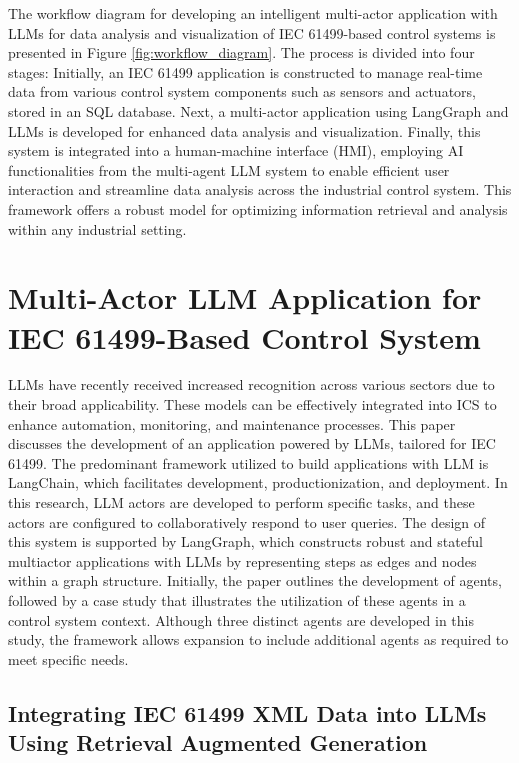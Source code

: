 \begin{bibunit}
The workflow diagram for developing an intelligent multi-actor application with LLMs for data analysis and visualization of IEC 61499-based control systems is presented in Figure \ref{fig:workflow_diagram}. The process is divided into four stages: Initially, an IEC 61499 application is constructed to manage real-time data from various control system components such as sensors and actuators, stored in an SQL database. Next, a multi-actor application using LangGraph and LLMs is developed for enhanced data analysis and visualization. Finally, this system is integrated into a human-machine interface (HMI), employing AI functionalities from the multi-agent LLM system to enable efficient user interaction and streamline data analysis across the industrial control system. This framework offers a robust model for optimizing information retrieval and analysis within any industrial setting.


\section{Multi-Actor LLM Application for IEC 61499-Based Control System}
\label{sec:methodology}

LLMs have recently received increased recognition across various sectors due to their broad applicability. These models can be effectively integrated into ICS to enhance automation, monitoring, and maintenance processes. This paper discusses the development of an application powered by LLMs, tailored for IEC 61499. The predominant framework utilized to build applications with LLM is LangChain, which facilitates development, productionization, and deployment. In this research, LLM actors are developed to perform specific tasks, and these actors are configured to collaboratively respond to user queries. The design of this system is supported by LangGraph, which constructs robust and stateful multiactor applications with LLMs by representing steps as edges and nodes within a graph structure. Initially, the paper outlines the development of agents, followed by a case study that illustrates the utilization of these agents in a control system context. Although three distinct agents are developed in this study, the framework allows expansion to include additional agents as required to meet specific needs.

\subsection{Integrating IEC 61499 XML Data into LLMs Using Retrieval Augmented Generation}


\end{bibunit}
